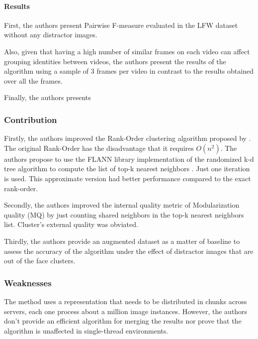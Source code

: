 \documentclass[17pt,]{extarticle}
\let\oldparagraph\paragraph
\renewcommand{\paragraph}[1]{\oldparagraph{#1}\mbox{}}
\begin{document}
\normalsize

\hypertarget{results}{%
\paragraph{Results}\label{results}}

First, the authors present Pairwise F-measure evaluated in the LFW dataset without any distractor images.

Also, given that having a high number of similar frames on each video can affect grouping identities between videos, the authors present the results of the algorithm using a sample of 3 frames per video in contrast to the results obtained over all the frames.

Finally, the authors presents

\hypertarget{contribution}{%
\subsubsection{Contribution}\label{contribution}}

Firstly, the authors improved the Rank-Order clustering algorithm proposed by \autocite{zhu2011}. The original Rank-Order has the disadvantage that it requires \(O(n^2)\). The authors propose to use the FLANN library implementation of the randomized k-d tree algorithm to compute the list of top-k nearest neighbors \autocite{hartley2008}. Just one iteration is used. This approximate version had better performance compared to the exact rank-order.

Secondly, the authors improved the internal quality metric of Modularization quality (MQ) \autocite{mancoridis1998} by just counting shared neighbors in the top-k nearest neighbors list. Cluster's external quality was obviated.

Thirdly, the authors provide an augmented dataset as a matter of baseline to assess the accuracy of the algorithm under the effect of distractor images that are out of the face clusters.

\hypertarget{weaknesses}{%
\subsubsection{Weaknesses}\label{weaknesses}}

The method uses a representation that needs to be distributed in chunks across servers, each one process about a million image instances. However, the authors don't provide an efficient algorithm for merging the results nor prove that the algorithm is unaffected in single-thread environments.
\end{document}
